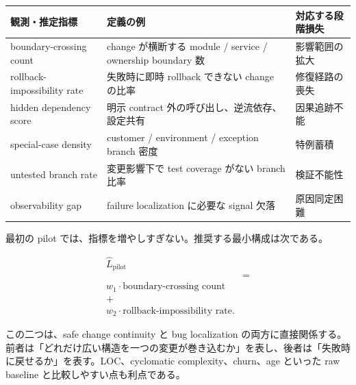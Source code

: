\documentclass[12pt,a4paper]{article}
\begin{document}
{\def\LTcaptype{table} %
\begin{longtable}[]{@{}
  >{\raggedright\arraybackslash}p{}
  >{\raggedright\arraybackslash}p{}
  >{\raggedright\arraybackslash}p{}@{}}
\toprule\noalign{}
\begin{minipage}[b]{\linewidth}\raggedright
観測・推定指標
\end{minipage} & \begin{minipage}[b]{\linewidth}\raggedright
定義の例
\end{minipage} & \begin{minipage}[b]{\linewidth}\raggedright
対応する段階損失
\end{minipage} \\
\midrule\noalign{}
\endhead
\bottomrule\noalign{}
\endlastfoot
boundary-crossing count & 1 change が横断する module / service / ownership boundary 数 & 影響範囲の拡大 \\
rollback-impossibility rate & 失敗時に即時 rollback できない change の比率 & 修復経路の喪失 \\
hidden dependency score & 明示 contract 外の呼び出し、逆流依存、設定共有 & 因果追跡不能 \\
special-case density & customer / environment / exception branch 密度 & 特例蓄積 \\
untested branch rate & 変更影響下で test coverage がない branch 比率 & 検証不能性 \\
observability gap & failure localization に必要な signal 欠落 & 原因同定困難 \\
\end{longtable}
}

最初の pilot では、指標を増やしすぎない。推奨する最小構成は次である。

\[
\begin{aligned}
\hat L_{\mathrm{pilot}} \\
&= \\
w_1 \cdot \text{boundary-crossing count} \\
+ \\
w_2 \cdot \text{rollback-impossibility rate}.
\end{aligned}
\]

この二つは、safe change continuity と bug localization の両方に直接関係する。前者は「どれだけ広い構造を一つの変更が巻き込むか」を表し、後者は「失敗時に戻せるか」を表す。LOC、cyclomatic complexity、churn、age といった raw baseline と比較しやすい点も利点である。
\end{document}
